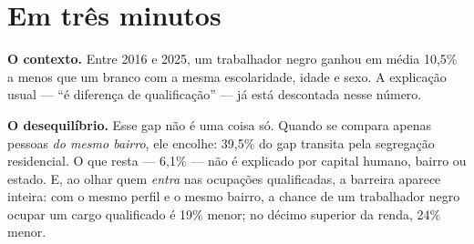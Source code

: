\documentclass[12pt, a4paper, oneside]{article}
\begin{document}
\begin{abstract}
The multilevel logistic model (random intercept by census tract) confirms an
occupational glass ceiling: controlling for education, sex, age, state, and neighbourhood
context, Black workers face odds of accessing a qualified occupation of 0.814
(95\% CI 0.810--0.818) relative to White workers from the same neighbourhood,
tightening to 0.761 in the top 10\% of income; an E-value of
1.5 indicates robustness to unobserved confounding. Interpretable
machine learning (XGBoost + SHAP) corroborates --- with no functional-form assumption
--- that race retains a direct negative contribution after all controls and that
territorial context ranks among the strongest predictors, indicating that residential
segregation is a relevant channel of inequality rather than a mere individual trait.
The penalty falls most heavily on Black women, at the intersection of race and gender.

\bigskip
\noindent\textbf{Keywords:} racial wage gap; structural discrimination; hierarchical
linear models; Oaxaca--Blinder decomposition; quantile regression; glass ceiling;
SHAP values; PNAD Contínua.
\end{abstract}

\newpage
\tableofcontents
\newpage


\newpage
\section*{Em três minutos}

\noindent\textbf{O contexto.} Entre 2016 e 2025, um trabalhador negro ganhou em média
10,5\% a menos que um branco com a mesma escolaridade, idade e sexo. A
explicação usual --- ``é diferença de qualificação'' --- já está descontada nesse número.

\medskip
\noindent\textbf{O desequilíbrio.} Esse gap não é uma coisa só. Quando se compara apenas
pessoas \emph{do mesmo bairro}, ele encolhe: 39,5\% do gap
transita pela segregação residencial. O que resta --- 6,1\% --- não é explicado
por capital humano, bairro ou estado. E, ao olhar quem \emph{entra} nas ocupações
qualificadas, a barreira aparece inteira: com o mesmo perfil e o mesmo bairro, a chance de
um trabalhador negro ocupar um cargo qualificado é 19\% menor; no décimo
superior da renda, 24\% menor.
\end{document}
